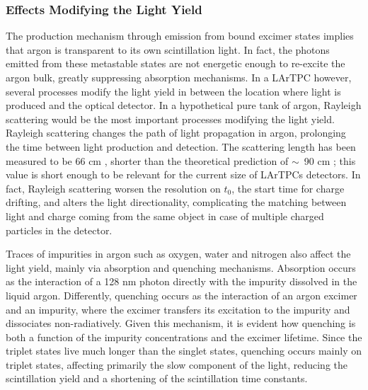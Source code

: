 \subsubsection{Effects Modifying the  Light Yield}
The production mechanism through emission from bound excimer states implies that argon is  transparent to its own scintillation light. In fact, the photons emitted from these metastable states are not energetic enough to re-excite the argon bulk, greatly suppressing absorption mechanisms. In a LArTPC however, several processes modify the light yield in between the location where light is produced and the optical detector. In a hypothetical pure tank of argon, Rayleigh scattering would be the most important processes modifying the light yield. Rayleigh scattering changes the path of light propagation in argon, prolonging the time between light production and detection.  The scattering length has been measured to be 66 cm \cite{Ishida1997} , shorter than the theoretical prediction of $\sim$~90 cm \cite{Teague1968}; this value is short enough to be relevant for the current size of LArTPCs detectors. In fact, Rayleigh scattering worsen the resolution on $t_0$, the start time for charge drifting, and  alters the light directionality, complicating the matching between light and charge coming from the same object in case of multiple charged particles in the detector. 

Traces of impurities in argon such as oxygen, water and nitrogen  also affect the light yield, mainly  via absorption and quenching mechanisms. 
Absorption occurs as the interaction of a 128 nm photon directly with the impurity dissolved in the liquid argon.  Differently, quenching occurs as the interaction of an argon excimer and an impurity, where the excimer transfers its excitation to the impurity and  dissociates non-radiatively.  Given this mechanism, it is evident how quenching is both a function of the impurity concentrations and the excimer lifetime.  Since the triplet states live much longer than the singlet states,  quenching occurs mainly on triplet states, affecting primarily the slow component of the light,  reducing the scintillation yield and a shortening of the scintillation time constants.  

